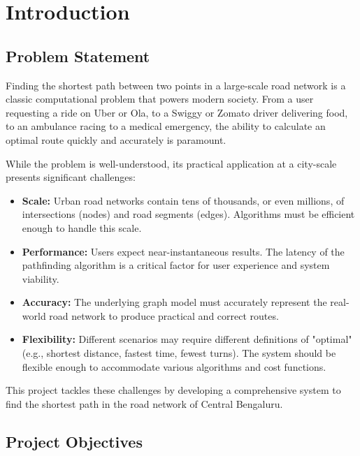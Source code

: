 \documentclass[12pt, a4paper]{report}
\begin{document}
\clearpage
\tableofcontents
\clearpage

\chapter{Introduction}

\section{Problem Statement}

Finding the shortest path between two points in a large-scale road network is a classic computational problem that powers modern society. From a user requesting a ride on Uber or Ola, to a Swiggy or Zomato driver delivering food, to an ambulance racing to a medical emergency, the ability to calculate an optimal route quickly and accurately is paramount.

While the problem is well-understood, its practical application at a city-scale presents significant challenges:
\begin{itemize}
    \item \textbf{Scale:} Urban road networks contain tens of thousands, or even millions, of intersections (nodes) and road segments (edges). Algorithms must be efficient enough to handle this scale.
    \item \textbf{Performance:} Users expect near-instantaneous results. The latency of the pathfinding algorithm is a critical factor for user experience and system viability.
    \item \textbf{Accuracy:} The underlying graph model must accurately represent the real-world road network to produce practical and correct routes.
    \item \textbf{Flexibility:} Different scenarios may require different definitions of "optimal" (e.g., shortest distance, fastest time, fewest turns). The system should be flexible enough to accommodate various algorithms and cost functions.
\end{itemize}
This project tackles these challenges by developing a comprehensive system to find the shortest path in the road network of Central Bengaluru.

\section{Project Objectives}
\end{document}

